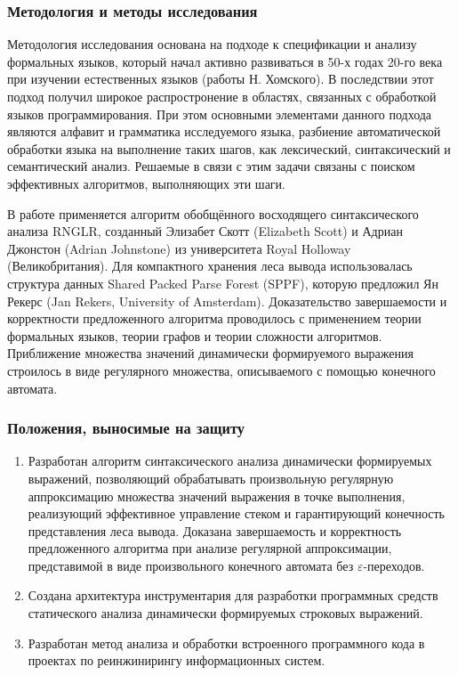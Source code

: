 \subsubsection*{\large{Методология и методы исследования}}

Методология исследования основана на подходе к спецификации и анализу формальных языков, который начал активно развиваться в 50-х годах 20-го века при изучении естественных языков (работы Н. Хомского). В последствии этот подход получил широкое распростронение в областях, связанных с обработкой языков программирования.
При этом основными элементами данного подхода являются алфавит и грамматика исследуемого языка, разбиение автоматической обработки языка на выполнение таких шагов, как лексический, синтаксический и семантический анализ. Решаемые в связи с этим задачи связаны с поиском эффективных алгоритмов, выполняющих эти шаги. 

В работе применяется алгоритм обобщённого восходящего синтаксического анализа RNGLR, созданный Элизабет Скотт (Elizabeth Scott) и Адриан Джонстон (Adrian Johnstone) из университета Royal Holloway (Великобритания). Для компактного хранения леса вывода использовалась структура данных Shared Packed Parse Forest (SPPF), которую предложил Ян Рекерс (Jan Rekers, University of Amsterdam). Доказательство завершаемости и корректности предложенного алгоритма проводилось с применением теории формальных языков, теории графов и теории сложности алгоритмов. Приближение множества значений динамически формируемого выражения строилось в виде регулярного множества, описываемого с помощью конечного автомата.

\subsubsection*{\large{Положения, выносимые на защиту}}
\begin{enumerate}
    \item Разработан алгоритм синтаксического анализа динамически формируемых выражений, позволяющий обрабатывать произвольную регулярную аппроксимацию множества значений выражения в точке выполнения, реализующий 
    эффективное управление стеком и гарантирующий конечность представления леса вывода. Доказана завершаемость и корректность предложенного алгоритма при анализе регулярной аппроксимации, представимой в виде произвольного конечного автомата без $\varepsilon$-переходов. 
    \item Создана архитектура инструментария для разработки программных средств статического анализа динамически формируемых строковых выражений.
    \item Разработан метод анализа и обработки встроенного программного кода в проектах по реинжинирингу информационных систем. 
\end{enumerate}


